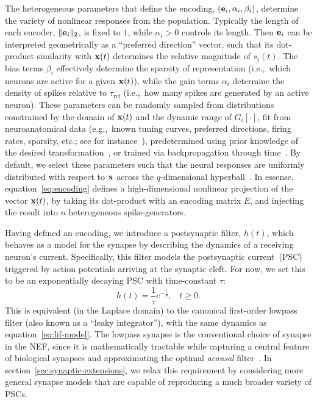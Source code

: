 The heterogeneous parameters that define the encoding, $(\mathbf{e}_i, \alpha_i, \beta_i)$, determine the variety of nonlinear responses from the population.
Typically the length of each encoder, $\| \mathbf{e}_i \|_2$, is fixed to $1$, while $\alpha_i > 0$ controls its length.
Then $\mathbf{e}_i$ can be interpreted geometrically as a ``preferred direction'' vector, such that its dot-product similarity with $\mathbf{x}(t)$ determines the relative magnitude of $s_i(t)$.
The bias terms $\beta_i$ effectively determine the sparsity of representation (i.e.,~which neurons are active for a given $\mathbf{x}(t)$), while the gain terms $\alpha_i$ determine the density of spikes relative to $\tau_\text{ref}$ (i.e.,~how many spikes are generated by an active neuron).
These parameters can be randomly sampled from distributions constrained by the domain of $\mathbf{x}(t)$ and the dynamic range of $G_i \left[ \cdot \right]$, fit from neuroanatomical data (e.g.,~known tuning curves, preferred directions, firing rates, sparsity, etc.; see for instance~\citet{voelker2016a}), predetermined using prior knowledge of the desired transformation~\citep{jgosmann2015}, or trained via backpropagation through time~\citep{rasmussen2018nengodl}.
By default, we select these parameters such that the neural responses are uniformly distributed with respect to $\mathbf{x}$ across the $q$-dimensional hyperball~\citep[][pp.~51--65]{gosmann2018}.
In essense, equation~\ref{eq:encoding} defines a high-dimensional nonlinear projection of the vector $\mathbf{x}(t)$, by taking its dot-product with an encoding matrix $E$, and injecting the result into $n$ heterogeneous spike-generators.

Having defined an encoding, we introduce a postsynaptic filter, $h(t)$, which behaves as a model for the synapse by describing the dynamics of a receiving neuron's current.
Specifically, this filter models the postsynaptic current~(PSC) triggered by action potentials arriving at the synaptic cleft.
For now, we set this to be an exponentially decaying PSC with time-constant $\tau$:
\begin{equation} \label{eq:lowpass-impulse}
h(t) = \frac{1}{\tau} e^{-\frac{t}{\tau}} \text{,} \quad t \ge 0 \text{.}
\end{equation}
This is equivalent (in the Laplace domain) to the canonical first-order lowpass filter (also known as a ``leaky integrator''), with the same dynamics as equation~\ref{eq:lif-model}.
The lowpass synapse is the conventional choice of synapse in the NEF, since it is mathematically tractable while capturing a central feature of biological synapses and approximating the optimal \emph{acausal} filter~\citep[][pp.~109--114,~223]{eliasmith2003a}.
In section~\ref{sec:synaptic-extensions}, we relax this requirement by considering more general synapse models that are capable of reproducing a much broader variety of PSCs.

